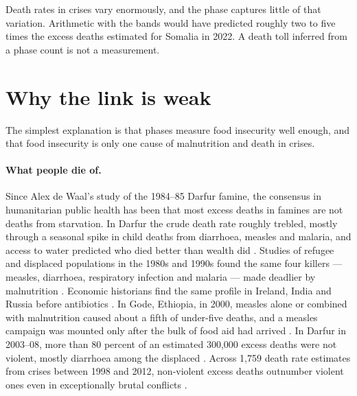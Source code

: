 \documentclass[11pt]{article}
\begin{document}
Death rates in crises vary enormously, and the phase captures little of that variation. Arithmetic with the bands would have predicted roughly two to five times the excess deaths estimated for Somalia in 2022. A death toll inferred from a phase count is not a measurement.

\section{Why the link is weak}\label{sec:why}

The simplest explanation is that phases measure food insecurity well enough, and that food insecurity is only one cause of malnutrition and death in crises.

\paragraph{What people die of.} Since Alex de Waal's study of the 1984--85 Darfur famine, the consensus in humanitarian public health has been that most excess deaths in famines are not deaths from starvation. In Darfur the crude death rate roughly trebled, mostly through a seasonal spike in child deaths from diarrhoea, measles and malaria, and access to water predicted who died better than wealth did \citep{dewaal1989famine,dewaal1989popstud}. Studies of refugee and displaced populations in the 1980s and 1990s found the same four killers --- measles, diarrhoea, respiratory infection and malaria --- made deadlier by malnutrition \citep{toole1990,toole1997}. Economic historians find the same profile in Ireland, India and Russia before antibiotics \citep{mokyr2002}. In Gode, Ethiopia, in 2000, measles alone or combined with malnutrition caused about a fifth of under-five deaths, and a measles campaign was mounted only after the bulk of food aid had arrived \citep{salama2001}. In Darfur in 2003--08, more than 80 percent of an estimated 300,000 excess deaths were not violent, mostly diarrhoea among the displaced \citep{degomme2010}. Across 1,759 death rate estimates from crises between 1998 and 2012, non-violent excess deaths outnumber violent ones even in exceptionally brutal conflicts \citep{heudtlass2016}.
\end{document}

